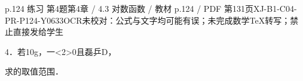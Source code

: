 \begin{bankitem}{p.124 练习 第4题}{第4章 / 4.3 对数函数 / 教材 p.124 / PDF 第131页}{XJ-B1-C04-PR-P124-Y0633}{OCR未校对：公式与文字均可能有误；未完成数学TeX转写；禁止直接发给学生}
\begin{ocrdraft}
\par
4．若10g，一<2>0且磊乒D，
\par
求的取值范围．
\end{ocrdraft}
\end{bankitem}
